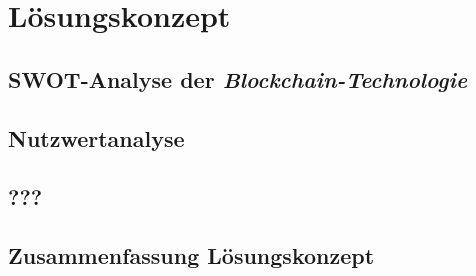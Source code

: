 \section{Lösungskonzept}

\subsection{SWOT-Analyse der \textit{Blockchain-Technologie}}

\subsection{Nutzwertanalyse}

\subsection{???}

\subsection{Zusammenfassung Lösungskonzept}

\newpage
